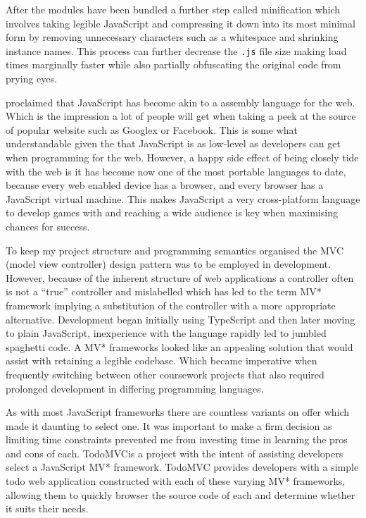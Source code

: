 \documentclass[final]{cmpreport}
\begin{document}
After the modules have been bundled a further step called minification which involves taking legible JavaScript and compressing it down into its most minimal form by removing unnecessary characters such as a whitespace and shrinking instance names. This process can further decrease the \texttt{.js} file size making load times marginally faster while also partially obfuscating the original code from prying eyes.

\cite{Hanselman} proclaimed that JavaScript has become akin to a assembly language for the web. Which is the impression a lot of people will get when taking a peek at the source of popular website such as Googlex or Facebook. This is some what understandable given the that JavaScript is as low-level as developers can get when programming for the web. However, a happy side effect of being closely tide with the web is it has become now one of the most portable languages to date, because every web enabled device has a browser, and every browser has a JavaScript virtual machine. This makes JavaScript a very cross-platform language to develop games with and reaching a wide audience is key when maximising chances for success.

To keep my project structure and programming semantics organised the MVC (model view controller) design pattern was to be employed in development. However, because of the inherent structure of web applications a controller often is not a ``true'' controller and mislabelled which has led to the term MV* framework implying a substitution of the controller with a more appropriate alternative. Development began initially using TypeScript and then later moving to plain JavaScript, inexperience with the language rapidly led to jumbled spaghetti code. A MV* frameworks looked like an appealing solution that would assist with retaining a legible codebase.  Which became imperative when frequently switching between other coursework projects that also required prolonged development in differing programming languages.

As with most JavaScript frameworks there are countless variants on offer which made it daunting to select one. It was important to make a firm decision as limiting time constraints prevented me from investing time in learning the pros and cons of each. TodoMVC\footnotemark is a project with the intent of assisting developers select a JavaScript MV* framework. TodoMVC provides developers with a simple todo web application constructed with each of these varying MV* frameworks, allowing them to quickly browser the source code of each and determine whether it suits their needs.
\end{document}

